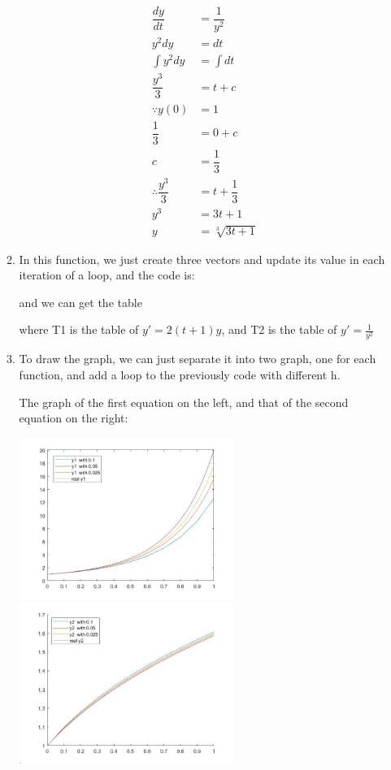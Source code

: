 \documentclass{article}
\begin{document}
\begin{enumerate}
\begin{enumerate}
\begin{align*}
\dfrac{dy}{dt}&=\dfrac{1}{y^2}\\
y^2 dy&=dt\\
\int y^2 dy &=\int dt\\
\dfrac{y^3}{3}&=t+c\\
\because y(0)&=1\\
\dfrac{1}{3}&=0+c\\
c&=\dfrac{1}{3}\\
\therefore \dfrac{y^3}{3}&=t+\dfrac{1}{3}\\
y^3&=3t+1\\
y&=\sqrt[3]{3t+1}
\end{align*}
\item

In this function, we just create three vectors and update its value in each iteration of a loop, and the code is:
 
 and we can get the table\begin{small}
 
 \end{small}
 where T1 is the table of $y' = 2(t+1)y$, and T2 is the table of $y'=\frac{1}{y^2}$
 \item
 
 To draw the graph, we can just separate it into two graph, one for each function, and add a loop to the previously code with different h.
 
  The graph of the first equation on the left, and that of the second equation on the right: \begin{center}
  \includegraphics[width=7cm]{y1.jpg} 
    \includegraphics[width=7cm]{y2.jpg} 
 \end{center}


\end{enumerate}
\end{enumerate}
\end{document}
